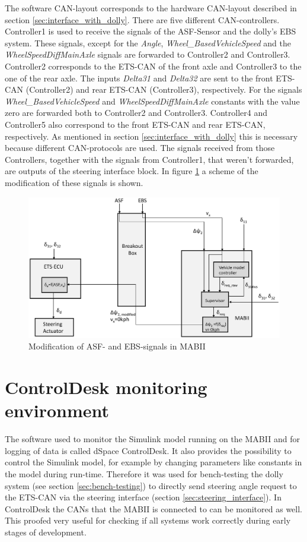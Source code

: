 \documentclass[ExampleMasters.tex]{subfiles}
\begin{document}
 The software \gls{CAN}-layout corresponds to the hardware \gls{CAN}-layout described in section \ref{sec:interface_with_dolly}. There are five different CAN-controllers. Controller1 is used to receive the signals of the \gls{ASF}-Sensor and the dolly's \gls{EBS} system. These signals, except for the \textit{Angle}, \textit{Wheel\_BasedVehicleSpeed} and the \textit{WheelSpeedDiffMainAxle} signals are forwarded to Controller2 and Controller3. Controller2 corresponds to the \gls{ETS}-\gls{CAN} of the front axle and Controller3 to the one of the rear axle. The inputs \textit{Delta31} and \textit{Delta32} are sent to the front \gls{ETS}-\gls{CAN} (Controller2) and rear \gls{ETS}-\gls{CAN} (Controller3), respectively. For the signals \textit{Wheel\_BasedVehicleSpeed} and  \textit{WheelSpeedDiffMainAxle} constants with the value zero are forwarded both to Controller2 and Controller3.
 Controller4 and Controller5 also correspond to the front \gls{ETS}-\gls{CAN} and rear \gls{ETS}-\gls{CAN}, respectively. As mentioned in section \ref{sec:interface_with_dolly} this is necessary because different CAN-protocols are used. The signals received from those Controllers, together with the signals from Controller1, that weren't forwarded, are outputs of the steering interface block. In figure \ref{fig:system_modification} a scheme of the modification of these signals is shown.
\begin{figure}[!htb]
	\centering
	\includegraphics[width=0.8\linewidth]{figures/system_mod}
	\caption{Modification of \gls{ASF}- and \gls{EBS}-signals in \gls{MABII}}
	\label{fig:system_modification}
\end{figure}

\section{ControlDesk monitoring environment}
\label{sec:control_desk}
The software used to monitor the Simulink model running on the \gls{MABII} and for logging of data is called dSpace ControlDesk. It also provides the possibility to control the Simulink model, for example by changing parameters like constants in the model during run-time. Therefore it was used for bench-testing the dolly system (see section \ref{sec:bench-testing}) to directly send steering angle request to the \gls{ETS}-\gls{CAN} via the steering interface (section \ref{sec:steering_interface}). In ControlDesk the \gls{CAN}s that the \gls{MABII} is connected to can be monitored as well. This proofed very useful for checking if all systems work correctly during early stages of development. 
\end{document}
